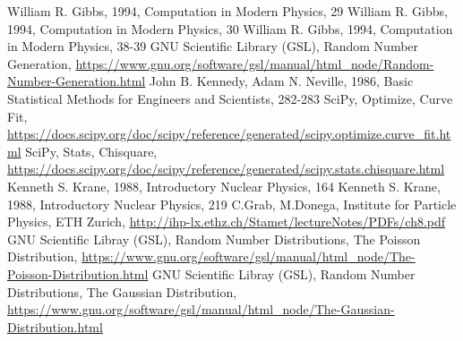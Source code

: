 \documentclass[10 pt]{article}
\numberwithin{equation}{section}
\begin{document}
\newpage
\begin{thebibliography}{2}
William R. Gibbs, 1994, Computation in Modern Physics, 29
William R. Gibbs, 1994, Computation in Modern Physics, 30
William R. Gibbs, 1994, Computation in Modern Physics, 38-39
GNU Scientific Library (GSL), Random Number Generation, \url{https://www.gnu.org/software/gsl/manual/html_node/Random-Number-Generation.html}
John B. Kennedy, Adam N. Neville, 1986, Basic Statistical Methods for Engineers and Scientists, 282-283
SciPy, Optimize, Curve Fit, \url{https://docs.scipy.org/doc/scipy/reference/generated/scipy.optimize.curve_fit.html}
SciPy, Stats, Chisquare, \url{https://docs.scipy.org/doc/scipy/reference/generated/scipy.stats.chisquare.html}
Kenneth S. Krane, 1988, Introductory Nuclear Physics, 164
Kenneth S. Krane, 1988, Introductory Nuclear Physics, 219
C.Grab, M.Donega, Institute for Particle Physics, ETH Zurich, \url{http://ihp-lx.ethz.ch/Stamet/lectureNotes/PDFs/ch8.pdf}
GNU Scientific Libray (GSL), Random Number Distributions, The Poisson Distribution, \url{https://www.gnu.org/software/gsl/manual/html_node/The-Poisson-Distribution.html}
GNU Scientific Libray (GSL), Random Number Distributions, The Gaussian Distribution, \url{https://www.gnu.org/software/gsl/manual/html_node/The-Gaussian-Distribution.html}
\end{thebibliography}
\end{document}
